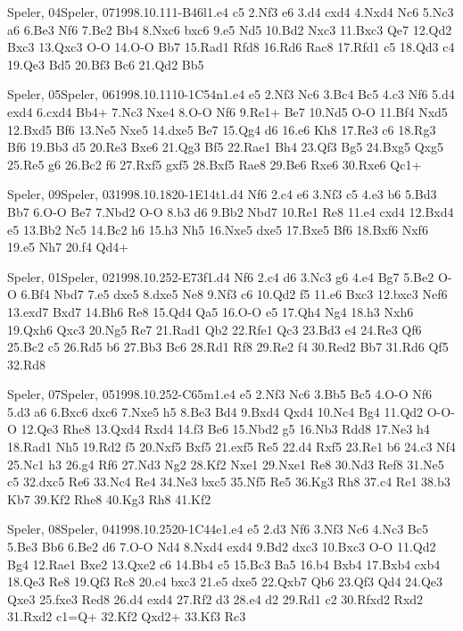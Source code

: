 \documentclass[twocolumn,a4paper,10pt]{report}
\begin{document}
\begin{chessgame}{Speler, 04}{Speler, 07}{1998.10.11}{1}{\textonehalf-\textonehalf}{B46l}{1.e4 c5 2.Nf3 e6 3.d4 cxd4 4.Nxd4 Nc6 5.Nc3 a6 6.Be3 Nf6 7.Be2 Bb4 8.Nxc6 bxc6 9.e5 Nd5 10.Bd2 Nxc3 11.Bxc3 Qe7 12.Qd2 Bxc3 13.Qxc3 O-O 14.O-O Bb7 15.Rad1 Rfd8 16.Rd6 Rac8 17.Rfd1 c5 18.Qd3 c4 19.Qe3 Bd5 20.Bf3 Bc6 21.Qd2 Bb5}\end{chessgame}
\begin{chessgame}{Speler, 05}{Speler, 06}{1998.10.11}{1}{0-1}{C54n}{1.e4 e5 2.Nf3 Nc6 3.Bc4 Bc5 4.c3 Nf6 5.d4 exd4 6.cxd4 Bb4+ 7.Nc3 Nxe4 8.O-O Nf6 9.Re1+ Be7 10.Nd5 O-O 11.Bf4 Nxd5 12.Bxd5 Bf6 13.Ne5 Nxe5 14.dxe5 Be7 15.Qg4 d6 16.e6 Kh8 17.Re3 c6 18.Rg3 Bf6 19.Bb3 d5 20.Re3 Bxe6 21.Qg3 Bf5 22.Rae1 Bh4 23.Qf3 Bg5 24.Bxg5 Qxg5 25.Re5 g6 26.Bc2 f6 27.Rxf5 gxf5 28.Bxf5 Rae8 29.Be6 Rxe6 30.Rxe6 Qc1+}\end{chessgame}
\begin{chessgame}{Speler, 09}{Speler, 03}{1998.10.18}{2}{0-1}{E14t}{1.d4 Nf6 2.c4 e6 3.Nf3 c5 4.e3 b6 5.Bd3 Bb7 6.O-O Be7 7.Nbd2 O-O 8.b3 d6 9.Bb2 Nbd7 10.Re1 Re8 11.e4 cxd4 12.Bxd4 e5 13.Bb2 Nc5 14.Bc2 h6 15.h3 Nh5 16.Nxe5 dxe5 17.Bxe5 Bf6 18.Bxf6 Nxf6 19.e5 Nh7 20.f4 Qd4+}\end{chessgame}
\begin{chessgame}{Speler, 01}{Speler, 02}{1998.10.25}{2}{\textonehalf-\textonehalf}{E73f}{1.d4 Nf6 2.c4 d6 3.Nc3 g6 4.e4 Bg7 5.Be2 O-O 6.Bf4 Nbd7 7.e5 dxe5 8.dxe5 Ne8 9.Nf3 c6 10.Qd2 f5 11.e6 Bxc3 12.bxc3 Nef6 13.exd7 Bxd7 14.Bh6 Re8 15.Qd4 Qa5 16.O-O e5 17.Qh4 Ng4 18.h3 Nxh6 19.Qxh6 Qxc3 20.Ng5 Re7 21.Rad1 Qb2 22.Rfe1 Qc3 23.Bd3 e4 24.Re3 Qf6 25.Bc2 c5 26.Rd5 b6 27.Bb3 Bc6 28.Rd1 Rf8 29.Re2 f4 30.Red2 Bb7 31.Rd6 Qf5 32.Rd8}\end{chessgame}
\begin{chessgame}{Speler, 07}{Speler, 05}{1998.10.25}{2}{\textonehalf-\textonehalf}{C65m}{1.e4 e5 2.Nf3 Nc6 3.Bb5 Bc5 4.O-O Nf6 5.d3 a6 6.Bxc6 dxc6 7.Nxe5 h5 8.Be3 Bd4 9.Bxd4 Qxd4 10.Nc4 Bg4 11.Qd2 O-O-O 12.Qe3 Rhe8 13.Qxd4 Rxd4 14.f3 Be6 15.Nbd2 g5 16.Nb3 Rdd8 17.Ne3 h4 18.Rad1 Nh5 19.Rd2 f5 20.Nxf5 Bxf5 21.exf5 Re5 22.d4 Rxf5 23.Re1 b6 24.c3 Nf4 25.Nc1 h3 26.g4 Rf6 27.Nd3 Ng2 28.Kf2 Nxe1 29.Nxe1 Re8 30.Nd3 Ref8 31.Ne5 c5 32.dxc5 Re6 33.Nc4 Re4 34.Ne3 bxc5 35.Nf5 Re5 36.Kg3 Rh8 37.c4 Re1 38.b3 Kb7 39.Kf2 Rhe8 40.Kg3 Rh8 41.Kf2}\end{chessgame}
\begin{chessgame}{Speler, 08}{Speler, 04}{1998.10.25}{2}{0-1}{C44e}{1.e4 e5 2.d3 Nf6 3.Nf3 Nc6 4.Nc3 Bc5 5.Be3 Bb6 6.Be2 d6 7.O-O Nd4 8.Nxd4 exd4 9.Bd2 dxc3 10.Bxc3 O-O 11.Qd2 Bg4 12.Rae1 Bxe2 13.Qxe2 c6 14.Bb4 c5 15.Bc3 Ba5 16.b4 Bxb4 17.Bxb4 cxb4 18.Qe3 Re8 19.Qf3 Rc8 20.c4 bxc3 21.e5 dxe5 22.Qxb7 Qb6 23.Qf3 Qd4 24.Qe3 Qxe3 25.fxe3 Red8 26.d4 exd4 27.Rf2 d3 28.e4 d2 29.Rd1 c2 30.Rfxd2 Rxd2 31.Rxd2 c1=Q+ 32.Kf2 Qxd2+ 33.Kf3 Rc3\mate}\end{chessgame}
\end{document}
